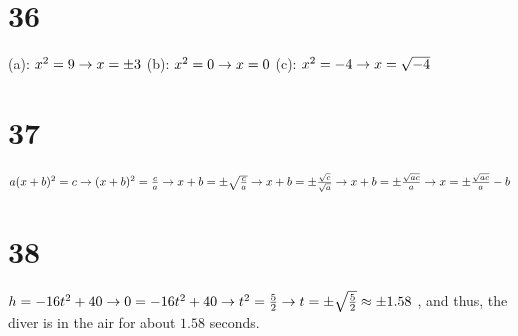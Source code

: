 \documentclass{article}
\theoremstyle{definition}
\begin{document}
\section*{36}
(a): $x^2=9\newline\rightarrow x=\pm 3$\newline
(b): $x^2=0\newline\rightarrow x=0$\newline
(c): $x^2=-4\newline\rightarrow x=\sqrt{-4}$

\section*{37}
$a(x+b)^2=c\newline\rightarrow (x+b)^2=\frac{c}{a}\newline\rightarrow x+b=\pm \sqrt\frac{c}{a}\newline\rightarrow 
x+b=\pm \frac{\sqrt{c}}{\sqrt{a}}\newline\rightarrow x+b=\pm \frac{\sqrt{ac}}{a}\newline\rightarrow x=\pm \frac{\sqrt{ac}}{a}-b$

\section*{38}
$h=-16t^2+40\newline\rightarrow 0=-16t^2+40\newline\rightarrow t^2=\frac{5}{2}\newline\rightarrow t=\pm \sqrt\frac{5}{2}\approx\pm 1.58$
, and thus, the diver is in 
the air for about $1.58$ seconds. 
\end{document}
